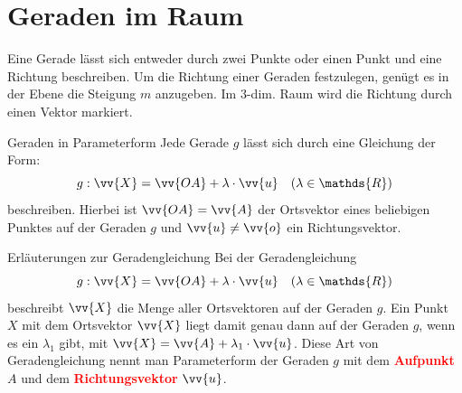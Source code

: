 \section{Geraden im Raum}
Eine Gerade lässt sich entweder durch zwei Punkte oder einen Punkt und eine Richtung beschreiben. Um die Richtung einer Geraden festzulegen, genügt es in der Ebene die Steigung \(m\) anzugeben. Im 3-dim. Raum wird die Richtung durch einen Vektor markiert.
\begin{defi}{Geraden in Parameterform}{}
 Jede Gerade \(g\) lässt sich durch eine Gleichung der Form: \[g: \vv{X} = \vv{OA} + \lambda \cdot \vv{u} \quad (\lambda \in \mathds{R})\] beschreiben. Hierbei ist \(\vv{OA} = \vv{A}\) der Ortsvektor eines beliebigen Punktes auf der Geraden \(g\) und \(\vv{u} \neq \vv{o}\) ein Richtungsvektor.  
\end{defi}
\begin{b8d}{Erläuterungen zur Geradengleichung}{}
Bei der Geradengleichung \[g: \vv{X} = \vv{OA} + \lambda \cdot \vv{u} \quad (\lambda \in \mathds{R})\] beschreibt \(\vv{X}\) die Menge aller Ortsvektoren auf der Geraden \(g\). Ein Punkt \(X\) mit dem Ortsvektor \(\vv{X}\) liegt damit genau dann auf der Geraden \(g\), wenn es ein \(\lambda_1\) gibt, mit \(\vv{X} = \vv{A} + \lambda_1 \cdot \vv{u}\). Diese Art von Geradengleichung nennt man Parameterform der Geraden \(g\) mit dem \textcolor{red}{\textbf{Aufpunkt}} \(A\) und dem \textcolor{red}{\textbf{Richtungsvektor}} \(\vv{u}\).
\end{b8d}
